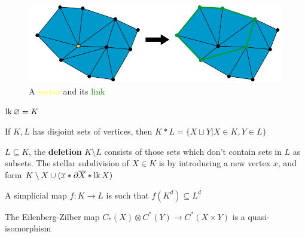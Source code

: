 \documentclass[main]{subfiles}
\begin{document}
\begin{definition}
\begin{figure}[h!]
\end{figure}
\begin{figure}[h!]
\centering
\includegraphics[scale=0.2]{Pictures/Link_of_a_complex}
\caption{A \textcolor{yellow}{vertex} and its \textcolor{green}{link}}\label{Link of a complex}
\end{figure}
\end{definition}

\begin{note}
$\operatorname{lk}\varnothing=K$
\end{note}

\begin{definition}
If $K,L$ has disjoint sets of vertices, then $K*L=\{X\sqcup Y|X\in K,Y\in L\}$
\end{definition}

\begin{definition}
$L\subseteq K$, the \textbf{deletion} $K\setminus L$ consists of those sets which don't contain sets in $L$ as subsets. The stellar subdivision of $X\in K$ is by introducing a new vertex $x$, and form $K\setminus X\cup(\overline x*\partial\overline X*\operatorname{lk} X)$
\end{definition}

\begin{definition}
A simplicial map $f:K\to L$ is such that $f(K^d)\subseteq L^d$
\end{definition}

The Eilenberg-Zilber map $C_*(X)\otimes C^*(Y)\to C^*(X\times Y)$ is a quasi-isomorphism
\end{document}
